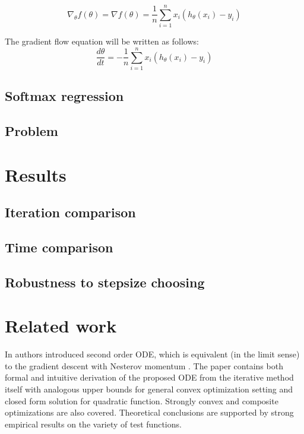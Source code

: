 \documentclass{article} %
\begin{document}
\begin{equation}\label{strang:LogReg_grad}
\nabla_\theta f(\theta) = \nabla f(\theta) = \dfrac{1}{n}\sum\limits_{i=1}^n x_i(h_\theta(x_i) - y_i)
\end{equation}

The gradient flow equation will be written as follows:
\begin{equation}\label{strang:LogReg_GF}
\dfrac{d \theta}{d t} = - \dfrac{1}{n}\sum\limits_{i=1}^n x_i(h_\theta(x_i) - y_i)
\end{equation}


\subsection{Softmax regression}
\subsection{Problem}


\section{Results}
\subsection{Iteration comparison}
\subsection{Time comparison}
\subsection{Robustness to stepsize choosing}



\section{Related work}

In \cite{su2014differential} authors introduced second order ODE, which is equivalent (in the limit sense) to the gradient descent with Nesterov momentum \cite{nesterov1983method}. The paper contains both formal and intuitive derivation of the proposed ODE from the iterative method itself with analogous upper bounds for general convex optimization setting and closed form solution for quadratic function. Strongly convex and composite optimizations are also covered. Theoretical conclusions are supported by strong empirical results on the variety of test functions.
\end{document}
